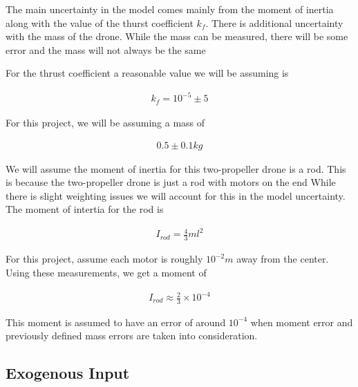     The main uncertainty in the model comes mainly from the moment of inertia
    along with the value of the thurst coefficient $k_f$.
    There is additional uncertainty with the mass of the drone.
    While the mass can be measured, there will be some error and the mass will not always be the same

    For the thrust coefficient a reasonable value we will be assuming is

    \begin{align}
        k_f = 10^{-5} \pm 5%
    \end{align}

    For this project, we will be assuming a mass of

    \begin{align}
        0.5 \pm 0.1 kg
    \end{align}

    We will assume the moment of inertia for this two-propeller drone is a rod.
    This is because the two-propeller drone is just a rod with motors on the end
    While there is slight weighting issues we will account for this in the model uncertainty.
    The moment of intertia for the rod is

    \begin{align}
        I_{rod} = \frac{4}{3}ml^2
    \end{align}

    For this project, assume each motor is roughly $10^{-2}m$ away from the center.
    Using these measurements, we get a moment of

    \begin{align}
        I_{rod} \approx \frac{2}{3} \times 10^{-4}
    \end{align}

    This moment is assumed to have an error of around $10^{-4}$ when moment error and
    previously defined mass errors are taken into consideration.

    \subsection{Exogenous Input}\label{subsec:exogenous-input}


